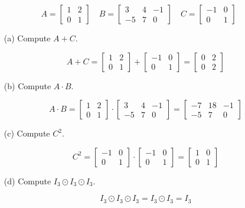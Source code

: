 \documentclass[11pt]{article}
\begin{document}
$$A= \begin{bmatrix}
1 & 2\\
0 & 1
\end{bmatrix}
\quad
B = \begin{bmatrix}
3 & 4 & -1\\
-5 & 7 & 0
\end{bmatrix}
\quad
C = \begin{bmatrix}
-1 & 0\\
0 & 1
\end{bmatrix}
$$

\begin{enumerate}
\item[(a)] Compute $A+C$.

$$A+C = \begin{bmatrix}
1 & 2\\
0 & 1
\end{bmatrix}
+ 
\begin{bmatrix}
-1 & 0\\
0 & 1
\end{bmatrix}
=
\begin{bmatrix}
0 & 2\\
0 & 2
\end{bmatrix}
$$



\item[(b)] Compute $A\cdot B$.

$$A\cdot B = \begin{bmatrix}
1 & 2\\
0 & 1
\end{bmatrix}
\cdot
\begin{bmatrix}
3 & 4 & -1\\
-5 & 7 & 0
\end{bmatrix}
=
\begin{bmatrix}
-7 & 18 & -1\\
-5 & 7 & 0
\end{bmatrix}
$$

\item[(c)] Compute $C^2$.

$$C^2 = \begin{bmatrix}
-1 & 0\\
0 & 1
\end{bmatrix}
\cdot \begin{bmatrix}
-1 & 0\\
0 & 1
\end{bmatrix}
=
\begin{bmatrix}
1 & 0\\
0 & 1
\end{bmatrix}
$$

\item[(d)] Compute $I_3 \odot I_3 \odot I_3$.

$$I_3 \odot I_3 \odot I_3 = I_3 \odot I_3 = I_3$$

\end{enumerate}
\end{document}

